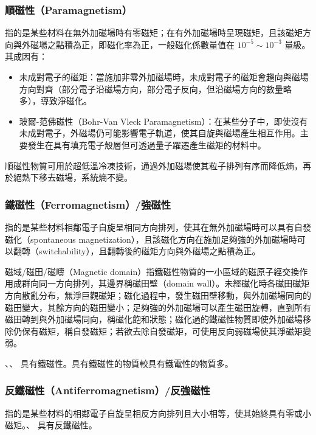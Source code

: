 \documentclass[a4paper,12pt]{report}
\begin{document}
\begin{itemize}
\subsubsection{順磁性（Paramagnetism）}
指的是某些材料在無外加磁場時有零磁矩；在有外加磁場時呈現磁矩，且該磁矩方向與外磁場之點積為正，即磁化率為正，一般磁化係數量值在 $10^{-5}\sim 10^{-3}$ 量級。其成因有：
\begin{itemize}
\item 未成對電子的磁矩：當施加非零外加磁場時，未成對電子的磁矩會趨向與磁場方向對齊（部分電子沿磁場方向，部分電子反向，但沿磁場方向的數量略多），導致淨磁化。
\item 玻爾-范佛磁性（Bohr-Van Vleck Paramagnetism）：在某些分子中，即使沒有未成對電子，外磁場仍可能影響電子軌道，使其自旋與磁場產生相互作用。主要發生在具有填充電子殼層但可透過量子躍遷產生磁矩的材料中。
\end{itemize}
順磁性物質可用於超低溫冷凍技術，通過外加磁場使其粒子排列有序而降低熵，再於絕熱下移去磁場，系統熵不變。
\subsubsection{鐵磁性（Ferromagnetism）/強磁性}
指的是某些材料相鄰電子自旋呈相同方向排列，使其在無外加磁場時可以具有自發磁化（spontaneous magnetization），且該磁化方向在施加足夠強的外加磁場時可以翻轉（switchability），且翻轉後的磁矩方向與外磁場之點積為正。

磁域/磁田/磁疇（Magnetic domain）指鐵磁性物質的一小區域的磁原子經交換作用成群向同一方向排列，其邊界稱磁田壁（domain wall）。未經磁化時各磁田磁矩方向散亂分布，無淨巨觀磁矩；磁化過程中，發生磁田壁移動，與外加磁場同向的磁田變大，其餘方向的磁田變小；足夠強的外加磁場可以產生磁田旋轉，直到所有磁田轉到與外加磁場同向，稱磁化飽和狀態；磁化過的鐵磁性物質即使外加磁場移除仍保有磁矩，稱自發磁矩；若欲去除自發磁矩，可使用反向弱磁場使其淨磁矩變弱。

、、 具有鐵磁性。具有鐵磁性的物質較具有鐵電性的物質多。
\subsubsection{反鐵磁性（Antiferromagnetism）/反強磁性}
指的是某些材料的相鄰電子自旋呈相反方向排列且大小相等，使其始終具有零或小磁矩。、 具有反鐵磁性。

\end{itemize}
\end{document}
